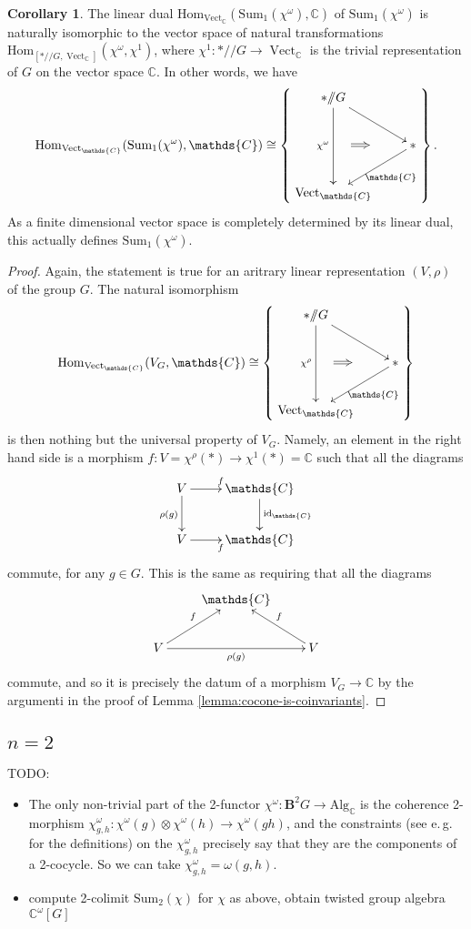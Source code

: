 \documentclass[12pt]{scrartcl}
\newcommand{\boldB}{\boldsymbol{B}}
\newcommand{\C}{\mathds{C}}
\newcommand{\Vect}{\operatorname{Vect}}
\theoremstyle{definition}
\newtheorem{corollary}[definition]{Corollary}
\numberwithin{equation}{section}
\numberwithin{definition}{section}
\numberwithin{figure}{section}
\begin{document}
\begin{corollary}
The linear dual $\mathrm{Hom}_{\Vect_\C}(\text{Sum}_1(\chi^\omega),\C)$ of $\text{Sum}_1(\chi^\omega)$ is naturally isomorphic to the vector space of natural transformations $\mathrm{Hom}_{[*/\!\!/ G,\Vect_\C]}(\chi^\omega,\chi^1)$, where $\chi^1\colon  */\!\!/ G \to \Vect_\C$ is the trivial representation of $G$ on the vector space $\C$. In other words, we have
\[
\mathrm{Hom}_{\Vect_\C}(\text{Sum}_1(\chi^\omega),\C)\cong \left\{
\raisebox{40pt}{\xymatrix{
{*}/\!\!/ G\ar[dd]_{\chi^\omega}\ar[dr]\\
&{*}\ar[dl]^{\C}\\
\Vect_\C
\ar@{=>}(5,-13);(10,-13)
}}
\right\}.
\]
As a finite dimensional vector space is completely determined by its linear dual, this actually defines $\text{Sum}_1(\chi^\omega)$.
\end{corollary}
\begin{proof}
Again, the statement is true for an aritrary linear representation $(V,\rho)$ of the group $G$. The natural isomorphism
\[
\mathrm{Hom}_{\Vect_\C}(V_G,\C)\cong \left\{
\raisebox{40pt}{\xymatrix{
{*}/\!\!/ G\ar[dd]_{\chi^\rho}\ar[dr]\\
&{*}\ar[dl]^{\C}\\
\Vect_\C
\ar@{=>}(5,-13);(10,-13)
}}
\right\}
\]
is then nothing but the universal property of $V_G$. Namely, an element in the right hand side is a morphism $f\colon V=\chi^\rho(*)\to \chi^1(*)=\C$ such that all the diagrams
\[
\xymatrix{
V\ar[d]_{\rho(g)}\ar[r]^f & \C\ar[d]^{\mathrm{id}_\C}\\
V\ar[r]_f &\C
}
\]
commute, for any $g\in G$. This is the same as requiring that all the diagrams
\[
\xymatrix{
&\C\\
V\ar[rr]_{\rho(g)}\ar[ru]^{f} &&V\ar[lu]_{f}
}
\]
commute, and so it is precisely the datum of a morphism $V_G\to \C$ by the argumenti in the proof of Lemma \ref{lemma:cocone-is-coinvariants}.
\end{proof}


\subsection{$n=2$}

TODO: 
\begin{itemize}
\item
The only non-trivial part of the 2-functor $\chi^\omega \colon \boldB^2 G \to \text{Alg}_\C$ is the coherence 2-morphism $\chi_{g,h}^\omega \colon \chi^\omega(g) \otimes  \chi^\omega(h) \to \chi^\omega(gh)$, and the constraints (see e.\,g.~\cite[Sect.\,1.1]{LeinsterBasic2} for the definitions) on the $\chi_{g,h}^\omega$ precisely say that they are the components of a 2-cocycle. 
So we can take $\chi_{g,h}^\omega = \omega(g,h)$. 
\item 
compute 2-colimit $\text{Sum}_2(\chi)$ for $\chi$ as above, obtain twisted group algebra $\C^\omega[G]$
\end{itemize}
\end{document}
